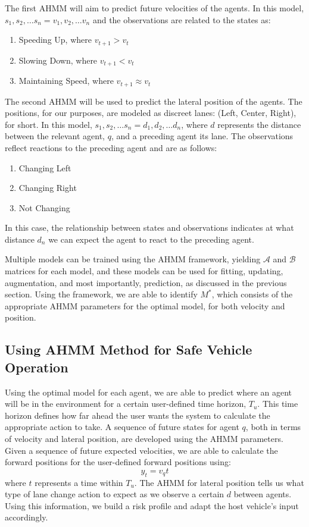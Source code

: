\documentclass[conference]{IEEEtran}
\begin{document}
The first AHMM will aim to predict future velocities of the agents. In this model, $s_1,s_2,\dots s_n = v_1, v_2,\dots v_n$ and the observations are related to the states as:

\begin{enumerate}
    \item Speeding Up, where $v_{t+1} > v_t$
    \item Slowing Down, where $v_{t+1} < v_t$
    \item Maintaining Speed, where $v_{t+1} \approx v_t$
\end{enumerate}

The second AHMM will be used to predict the lateral position of the agents. The positions, for our purposes, are modeled as discreet lanes: (Left, Center, Right), for short.  In this model, $s_1,s_2,\dots s_n = d_1, d_2,\dots d_n$, where $d$ represents the distance between the relevant agent, $q$, and a preceding agent its lane. The observations reflect reactions to the preceding agent and are as follows:
\begin{enumerate}
    \item Changing Left
    \item Changing Right
    \item Not Changing
\end{enumerate}
In this case, the relationship between states and observations indicates at what distance $d_n$ we can expect the agent to react to the preceding agent.

Multiple models can be trained using the AHMM framework, yielding $\mathcal{A}$ and $\mathcal{B}$ matrices for each model, and these models can be used for fitting, updating, augmentation, and most importantly, prediction, as discussed in the previous section. Using the framework, we are able to identify $M^*$, which consists of the appropriate AHMM parameters for the optimal model, for both velocity and position.

\subsection{Using AHMM Method for Safe Vehicle Operation}
Using the optimal model for each agent, we are able to predict where an agent will be in the environment for a certain user-defined time horizon, $T_{u}$. This time horizon defines how far ahead the user wants the system to calculate the appropriate action to take.  A sequence of future states for agent $q$, both in terms of velocity and lateral position, are developed using the AHMM parameters. Given a sequence of future expected velocities, we are able to calculate the forward positions for the user-defined forward positions using:
\begin{equation} \label{eq:dumpos}
    y_t = v_qt
\end{equation}
where $t$ represents a time within $T_{u}$. The AHMM for lateral position tells us what type of lane change action to expect as we observe a certain $d$ between agents. Using this information, we build a risk profile and adapt the host vehicle's input accordingly.
\end{document}
